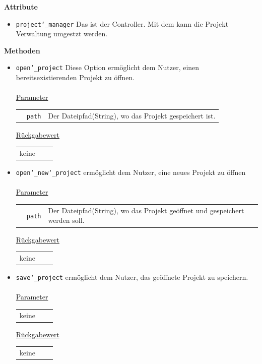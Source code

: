 \documentclass{article}
\begin{document}
\textbf{{Attribute}}
\begin{itemize}
\item \texttt{project\char`_manager} \newline Das ist der Controller. Mit dem kann die Projekt Verwaltung umgestzt werden.
\end{itemize}

\textbf{{Methoden}}
\begin{itemize}
\item \texttt{open\char`_project} \newline Diese Option ermöglicht dem Nutzer, einen bereitsexistierenden Projekt zu öffnen.
\\\\
\underline{{Parameter}}
\begin{tabular}{lll}
 & \texttt{path} & Der Dateipfad(String), wo das Projekt gespeichert ist. \\
\end{tabular}

\underline{{Rückgabewert}}
\begin{tabular}{lll}
 keine \\
\end{tabular}

\item \texttt{open\char`_new\char`_project} \newline ermöglicht dem Nutzer, eine neues Projekt zu öffnen
\\\\
\underline{{Parameter}}
\begin{tabular}{lll}
 & \texttt{path} & Der Dateipfad(String), wo das Projekt geöffnet und gespeichert werden soll. \\
\end{tabular}

\underline{{Rückgabewert}}
\begin{tabular}{lll}
 keine \\
\end{tabular}

\item \texttt{save\char`_project} \newline ermöglicht dem Nutzer, das geöffnete Projekt zu speichern.
\\\\
\underline{{Parameter}}
\begin{tabular}{lll}
 keine \\
\end{tabular}

\underline{{Rückgabewert}}
\begin{tabular}{lll}
 keine \\
\end{tabular}


\end{itemize}
\end{document}
